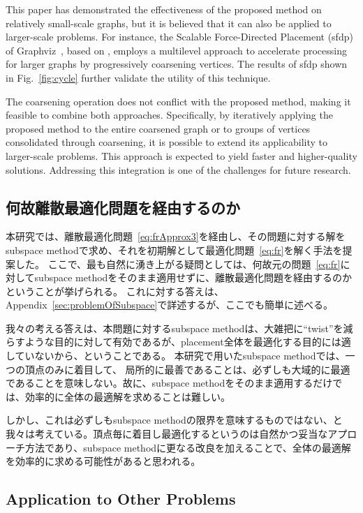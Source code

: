 \documentclass[dvipdfmx,lettersize,journal]{IEEEtran}
\begin{document}
This paper has demonstrated the effectiveness of the proposed method on relatively small-scale graphs, but it is believed that it can also be applied to larger-scale problems.
For instance, the Scalable Force-Directed Placement (sfdp) of Graphviz~\cite{ellsonGraphvizOpenSource2002}, based on \cite{Hu2006EfficientHF}, employs a multilevel approach to accelerate processing for larger graphs by progressively coarsening vertices.
The results of sfdp shown in Fig.~\ref{fig:cycle} further validate the utility of this technique.

The coarsening operation does not conflict with the proposed method, making it feasible to combine both approaches. Specifically, by iteratively applying the proposed method to the entire coarsened graph or to groups of vertices consolidated through coarsening, it is possible to extend its applicability to larger-scale problems. This approach is expected to yield faster and higher-quality solutions. Addressing this integration is one of the challenges for future research.

\subsection{何故離散最適化問題を経由するのか}\label{sec:whyDiscrete}

本研究では、離散最適化問題~\eqref{eq:frApprox3}を経由し、その問題に対する解をsubspace methodで求め、それを初期解として最適化問題~\eqref{eq:fr}を解く手法を提案した。
ここで、最も自然に湧き上がる疑問としては、何故元の問題~\eqref{eq:fr}に対してsubspace methodをそのまま適用せずに、離散最適化問題を経由するのかということが挙げられる。
これに対する答えは、Appendix~\ref{sec:problemOfSubspace}で詳述するが、ここでも簡単に述べる。

我々の考える答えは、本問題に対するsubspace methodは、大雑把に``twist''を減らすような目的に対して有効であるが、placement全体を最適化する目的には適していないから、ということである。
本研究で用いたsubspace methodでは、一つの頂点のみに着目して、
局所的に最善であることは、必ずしも大域的に最適であることを意味しない。故に、subspace methodをそのまま適用するだけでは、効率的に全体の最適解を求めることは難しい。

しかし、これは必ずしもsubspace methodの限界を意味するものではない、と我々は考えている。頂点毎に着目し最適化するというのは自然かつ妥当なアプローチ方法であり、subspace methodに更なる改良を加えることで、全体の最適解を効率的に求める可能性があると思われる。

\subsection{Application to Other Problems}\label{ssec:application}
\end{document}
